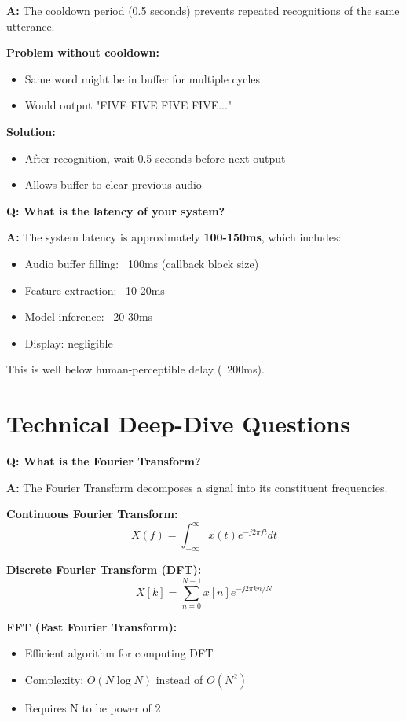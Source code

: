 \documentclass[a4paper,12pt]{article}
\newcommand{\vivaQ}[1]{\textcolor{questioncolor}{\textbf{Q: #1}}}
\newcommand{\vivaA}[1]{\textcolor{answercolor}{\textbf{A:}} #1}
\begin{document}
\vivaA{The cooldown period (0.5 seconds) prevents repeated recognitions of the same utterance.

\textbf{Problem without cooldown:}
\begin{itemize}
    \item Same word might be in buffer for multiple cycles
    \item Would output "FIVE FIVE FIVE FIVE..."
\end{itemize}

\textbf{Solution:}
\begin{itemize}
    \item After recognition, wait 0.5 seconds before next output
    \item Allows buffer to clear previous audio
\end{itemize}}

\vspace{0.5cm}

\vivaQ{What is the latency of your system?}

\vivaA{The system latency is approximately \textbf{100-150ms}, which includes:
\begin{itemize}
    \item Audio buffer filling: ~100ms (callback block size)
    \item Feature extraction: ~10-20ms
    \item Model inference: ~20-30ms
    \item Display: negligible
\end{itemize}

This is well below human-perceptible delay (~200ms).}

\section{Technical Deep-Dive Questions}

\vivaQ{What is the Fourier Transform?}

\vivaA{The Fourier Transform decomposes a signal into its constituent frequencies.

\textbf{Continuous Fourier Transform:}
\[X(f) = \int_{-\infty}^{\infty} x(t) e^{-j2\pi ft} dt\]

\textbf{Discrete Fourier Transform (DFT):}
\[X[k] = \sum_{n=0}^{N-1} x[n] e^{-j2\pi kn/N}\]

\textbf{FFT (Fast Fourier Transform):}
\begin{itemize}
    \item Efficient algorithm for computing DFT
    \item Complexity: $O(N \log N)$ instead of $O(N^2)$
    \item Requires N to be power of 2
\end{itemize}}
\end{document}
